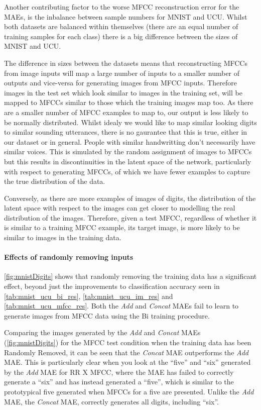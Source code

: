 Another contributing factor to the worse \ac{MFCC} reconstruction error for the \acp{MAE}, is the inbalance between sample numbers for MNIST and UCU. Whilst both datasets are balanced within themselves (there are an equal number of training samples for each class) there is a big difference between the sizes of MNIST and UCU. 

The difference in sizes between the datasets means that reconstructing \acp{MFCC} from image inputs will map a large number of inputs to a smaller number of outputs and vice-versa for generating images from \ac{MFCC} inputs. Therefore images in the test set which look similar to images in the training set, will be mapped to \acp{MFCC} similar to those which the training images map too. As there are a smaller number of \ac{MFCC} examples to map to, our output is less likely to be normally distributed. Whilst idealy we would like to map similar looking digits to similar sounding utterances, there is no gaurantee that this is true, either in our dataset or in general. People with similar handwritting don't necessarily have similar voices. This is simulated by the random assignment of images to \acp{MFCC} but this results in discontinuities in the latent space of the network, particularly with respect to generating \acp{MFCC}, of which we have fewer examples to capture the true distribution of the data.

Conversely, as there are more examples of images of digits, the distribution of the latent space with respect to the images can get closer to modelling the real distribution of the images. Therefore, given a test \ac{MFCC}, regardless of whether it is similar to a training \ac{MFCC} example, its target image, is more likely to be similar to images in the training data. 

\paragraph{Effects of randomly removing inputs}
\autoref{fig:mnistDigits} shows that randomly removing the training data has a significant effect, beyond just the improvements to classification accuracy seen in \autoref{tab:mnist_ucu_bi_res}, \autoref{tab:mnist_ucu_im_res} and \autoref{tab:mnist_ucu_mfcc_res}. Both the \textit{Add} and \textit{Concat} \acp{MAE} fail to learn to generate images from \ac{MFCC} data using the Bi training procedure.

Comparing the images generated by the \textit{Add} and \textit{Concat} \acp{MAE} (\autoref{fig:mnistDigits}) for the \ac{MFCC} test condition when the training data has been Randomly Removed, it can be seen that the \textit{Concat} \ac{MAE} outperforms the \textit{Add} \ac{MAE}. This is particularly clear when you look at the ``five'' and ``six'' generated by the \textit{Add} \ac{MAE} for RR X \ac{MFCC}, where the \ac{MAE} has failed to correctly generate a ``six'' and has instead generated a ``five'', which is similar to the prototypical five generated when \acp{MFCC} for a five are presented.
Unlike the \textit{Add} \ac{MAE}, the \textit{Concat} \ac{MAE}, correctly generates all digits, including ``six''.

